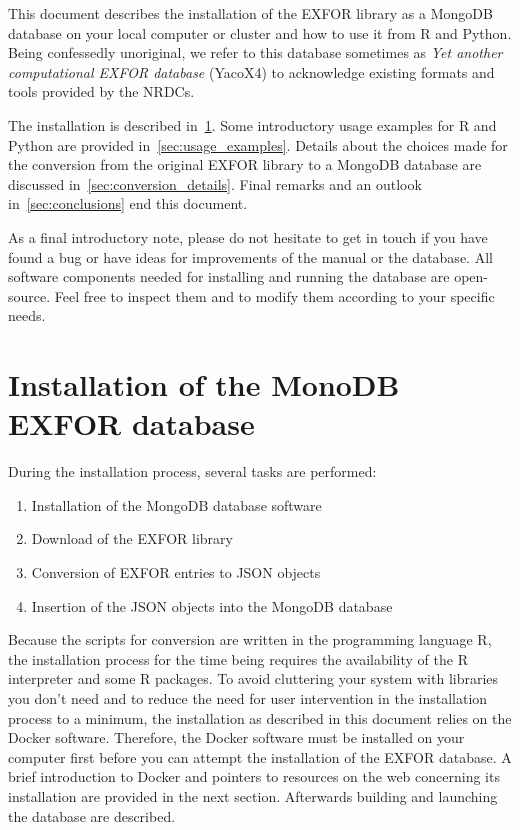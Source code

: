 \documentclass[12pt,a4paper]{scrartcl}
\begin{document}
  This document describes the installation of the EXFOR library as a MongoDB database on your local computer or cluster and how to use it from R and Python.
  Being confessedly unoriginal, we refer to this database sometimes as \textit{Yet another computational EXFOR database} (YacoX4) to acknowledge existing formats and tools provided by the NRDCs.  
  
  The installation is described in~\cref{sec:install_EXFOR}.
  Some introductory usage examples for R and Python are provided in~\cref{sec:usage_examples}.
 Details about the choices made for the conversion from the original EXFOR library to a MongoDB database are discussed in~\cref{sec:conversion_details}.
 Final remarks and an outlook in~\cref{sec:conclusions} end this document.
 
As a final introductory note, please do not hesitate to get in touch if you have found a bug or have ideas for improvements of the manual or the database.
All software components needed for installing and running the database are open-source.
Feel free to inspect them and to modify them according to your specific needs.

 \section{Installation of the MonoDB EXFOR database}
 \label{sec:install_EXFOR}

 During the installation process, several tasks are performed:
\begin{enumerate}
 \item Installation of the MongoDB database software
 \item Download of the EXFOR library
 \item Conversion of EXFOR entries to JSON objects
 \item Insertion of the JSON objects into the MongoDB database 
\end{enumerate}
Because the scripts for conversion are written in the programming language R, the installation process for the time being requires the availability of the R interpreter and some R packages.
To avoid cluttering your system with libraries you don't need and to reduce the need for user intervention in the installation process to a minimum, the installation as described in this document relies on the Docker software.
Therefore, the Docker software must be installed on your computer first before you can attempt the installation of the EXFOR database.
A brief introduction to Docker and pointers to resources on the web concerning its installation are provided in the next section.
Afterwards building and launching the database are described.
\end{document}
